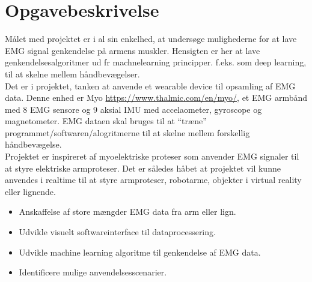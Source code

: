 \thispagestyle{fancy}
\chapter{Opgavebeskrivelse}
Målet med projektet er i al sin enkelhed, at undersøge mulighederne for at lave EMG signal genkendelse på armens muskler. Hensigten er her at lave genkendelsesalgoritmer ud fr machnelearning principper. f.eks. som deep learning, til at skelne mellem håndbevægelser.\\

Det er i projektet, tanken at anvende et wearable device til opsamling af EMG data. Denne enhed er Myo \href{https://www.thalmic.com/en/myo/}{https://www.thalmic.com/en/myo/}, et EMG armbånd med 8 EMG sensore og 9 aksial IMU med accelaometer, gyroscope og magnetometer. EMG dataen skal bruges til at “træne” programmet/softwaren/alogritmerne til at skelne mellem forskellig håndbevægelse.\\

Projektet er inspireret af myoelektriske proteser som anvender EMG signaler til at styre elektriske armproteser. Det er således håbet at projektet vil kunne anvendes i realtime til at styre armproteser, robotarme, objekter i virtual reality eller lignende.

\begin{itemize}
	\item Anskaffelse af store mængder EMG data fra arm eller lign.
	\item Udvikle visuelt softwareinterface til dataprocessering.
	\item Udvikle machine learning algoritme til genkendelse af EMG data.
	\item Identificere mulige anvendelsesscenarier.
\end{itemize}